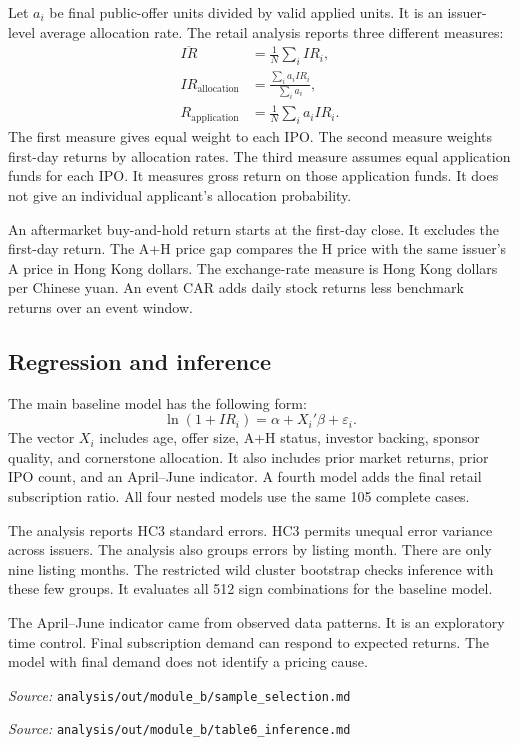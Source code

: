 \documentclass[11pt,a4paper]{article}
\newcommand{\src}[1]{\par{\footnotesize\textit{Source:} \nolinkurl{#1}}}
\begin{document}
Let $a_i$ be final public-offer units divided by valid applied units.
It is an issuer-level average allocation rate.
The retail analysis reports three different measures:
\begin{align}
\overline{IR}&=\frac{1}{N}\sum_i IR_i,\\
IR_{\mathrm{allocation}}&=\frac{\sum_i a_iIR_i}{\sum_i a_i},\\
R_{\mathrm{application}}&=\frac{1}{N}\sum_i a_iIR_i.
\end{align}
The first measure gives equal weight to each IPO.
The second measure weights first-day returns by allocation rates.
The third measure assumes equal application funds for each IPO.
It measures gross return on those application funds.
It does not give an individual applicant's allocation probability.

An aftermarket buy-and-hold return starts at the first-day close.
It excludes the first-day return.
The A+H price gap compares the H price with the same issuer's A price in Hong Kong dollars.
The exchange-rate measure is Hong Kong dollars per Chinese yuan.
An event CAR adds daily stock returns less benchmark returns over an event window.

\subsection{Regression and inference}
The main baseline model has the following form:
\begin{equation}
\ln(1+IR_i)=\alpha+X_i'\beta+\varepsilon_i.
\end{equation}
The vector $X_i$ includes age, offer size, A+H status, investor backing, sponsor quality, and cornerstone allocation.
It also includes prior market returns, prior IPO count, and an April--June indicator.
A fourth model adds the final retail subscription ratio.
All four nested models use the same 105 complete cases.

The analysis reports HC3 standard errors.
HC3 permits unequal error variance across issuers.
The analysis also groups errors by listing month.
There are only nine listing months.
The restricted wild cluster bootstrap checks inference with these few groups.
It evaluates all 512 sign combinations for the baseline model.

The April--June indicator came from observed data patterns.
It is an exploratory time control.
Final subscription demand can respond to expected returns.
The model with final demand does not identify a pricing cause.
\src{analysis/out/module_b/sample_selection.md}
\src{analysis/out/module_b/table6_inference.md}
\end{document}
